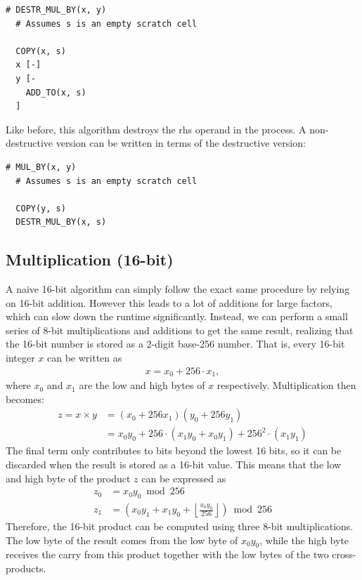 \vspace{0.5cm}\noindent\begin{minipage}{\linewidth}
\begin{lstlisting}[style=brainfuck]
  # DESTR_MUL_BY(x, y)
  # Assumes s is an empty scratch cell
  
  COPY(x, s)
  x [-]
  y [-
    ADD_TO(x, s)
  ]
\end{lstlisting}
\end{minipage}
%
Like before, this algorithm destroys the rhs operand in the process. A non-destructive version can be written in terms of the destructive version:

\vspace{0.5cm}\noindent\begin{minipage}{\linewidth}
\begin{lstlisting}[style=brainfuck]
  # MUL_BY(x, y)
  # Assumes s is an empty scratch cell
  
  COPY(y, s)
  DESTR_MUL_BY(x, s)
\end{lstlisting}
\end{minipage}


\subsection{Multiplication (16-bit)} A naive 16-bit algorithm can simply follow the exact same procedure by relying on 16-bit addition. However this leads to a lot of additions for large factors, which can slow down the runtime significantly. Instead, we can perform a small series of 8-bit multiplications and additions to get the same result, realizing that the 16-bit number is stored as a 2-digit base-256 number. That is, every 16-bit integer $x$ can be written as
%
\begin{align}
  x = x_0 + 256\cdot x_1,
\end{align}
%
where $x_0$ and $x_1$ are the low and high bytes of $x$ respectively. Multiplication then becomes:
%
\begin{align}
  z = x \times y &= (x_0 + 256x_1)(y_0 + 256y_1) \\
                 &= x_0y_0 + 256\cdot(x_1y_0 + x_0y_1) + 256^2\cdot(x_1y_1)
\end{align}
%
The final term only contributes to bits beyond the lowest 16 bits, so it can be discarded when the result is stored as a 16-bit value. This means that the low and high byte of the product $z$ can be expressed as
%
\begin{align}
z_0 &= x_0 y_0 \bmod 256 \\
z_1 &= \left(x_0 y_1 + x_1 y_0 + \left\lfloor \frac{x_0 y_0}{256} \right\rfloor \right) \bmod 256 
\end{align}
%
Therefore, the 16-bit product can be computed using three 8-bit multiplications. The low byte of the result comes from the low byte of $x_0y_0$, while the high byte receives the carry from this product together with the low bytes of the two cross-products.

